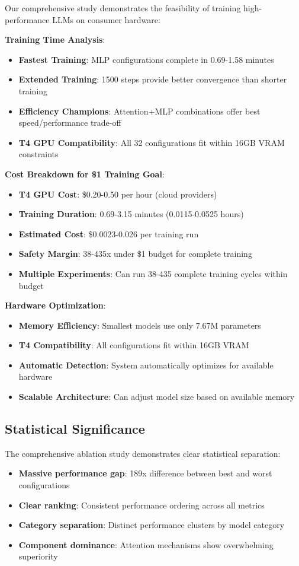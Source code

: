 \documentclass[11pt,a4paper]{article}
\begin{document}
Our comprehensive study demonstrates the feasibility of training high-performance LLMs on consumer hardware:

\textbf{Training Time Analysis}:
\begin{itemize}
    \item \textbf{Fastest Training}: MLP configurations complete in 0.69-1.58 minutes
    \item \textbf{Extended Training}: 1500 steps provide better convergence than shorter training
    \item \textbf{Efficiency Champions}: Attention+MLP combinations offer best speed/performance trade-off
    \item \textbf{T4 GPU Compatibility}: All 32 configurations fit within 16GB VRAM constraints
\end{itemize}

\textbf{Cost Breakdown for \$1 Training Goal}:
\begin{itemize}
    \item \textbf{T4 GPU Cost}: \$0.20-0.50 per hour (cloud providers)
    \item \textbf{Training Duration}: 0.69-3.15 minutes (0.0115-0.0525 hours)
    \item \textbf{Estimated Cost}: \$0.0023-0.026 per training run
    \item \textbf{Safety Margin}: 38-435x under \$1 budget for complete training
    \item \textbf{Multiple Experiments}: Can run 38-435 complete training cycles within budget
\end{itemize}

\textbf{Hardware Optimization}:
\begin{itemize}
    \item \textbf{Memory Efficiency}: Smallest models use only 7.67M parameters
    \item \textbf{T4 Compatibility}: All configurations fit within 16GB VRAM
    \item \textbf{Automatic Detection}: System automatically optimizes for available hardware
    \item \textbf{Scalable Architecture}: Can adjust model size based on available memory
\end{itemize}

\subsection{Statistical Significance}

The comprehensive ablation study demonstrates clear statistical separation:
\begin{itemize}
    \item \textbf{Massive performance gap}: 189x difference between best and worst configurations
    \item \textbf{Clear ranking}: Consistent performance ordering across all metrics
    \item \textbf{Category separation}: Distinct performance clusters by model category
    \item \textbf{Component dominance}: Attention mechanisms show overwhelming superiority
\end{itemize}
\end{document}
